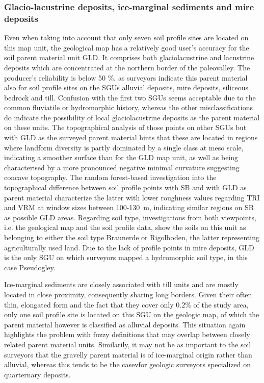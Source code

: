 \documentclass[preprint,12pt,authoryear]{elsarticle}
\begin{document}
\subsubsection{Glacio-lacustrine deposits, ice-marginal sediments and mire deposits}
Even when taking into account that only seven soil profile sites are located on this map unit, the geological map has a relatively good user's accuracy for the soil parent material unit GLD. It comprises both glaciolacustrine and lacustrine deposits which are concentrated at the northern border of the paleovalley. The producer's reliability is below 50 \%, as surveyors indicate this parent material also for soil profile sites on the SGUs alluvial deposits,  mire deposits, siliceous bedrock and till. Confusion with the first two SGUs seems acceptable due to the common fluviatile or hydromorphic history, whereas the other misclassifications do indicate the possibility of local glaciolacustrine deposits as the parent material on these units. The topographical analysis of those points on other SGUs but with GLD as the surveyed parent material hints that these are located in regions where landform diversity is partly dominated by a single class at meso scale, indicating a smoother surface than for the GLD map unit, as well as being characterised by a more pronounced negative minimal curvature suggesting concave topography. The random forest-based investigation into the topographical difference between soil profile points with SB and with GLD as parent material characterize the latter with lower roughness values regarding TRI and VRM at window sizes between 100-130~m, indicating similar regions on SB as possible GLD areas.
Regarding soil type, investigations from both viewpoints, i.e. the geological map and the soil profile data, show the soils on this unit as belonging to either the soil type Braunerde or Rigolboden, the latter representing agriculturally used land. Due to the lack of profile points in mire deposits, GLD is the only SGU on which surveyors mapped a hydromorphic soil type, in this case Pseudogley.

Ice-marginal sediments are closely associated with till units and are mostly located in close proximity, consequently sharing  long borders. Given their often thin, elongated form and the fact that they cover only 0.2\% of the study area, only one soil profile site is located on this SGU on the geologic map, of which the parent material however is classified as alluvial deposits. This situation again highlights the problem with fuzzy definitions that may overlap between closely related parent material units. Similarily, it may not be as important to the soil surveyors that the gravelly parent material is of ice-marginal origin rather than alluvial, whereas this tends to be the casevfor geologic surveyors specialized on quarternary deposits. 
\end{document}
